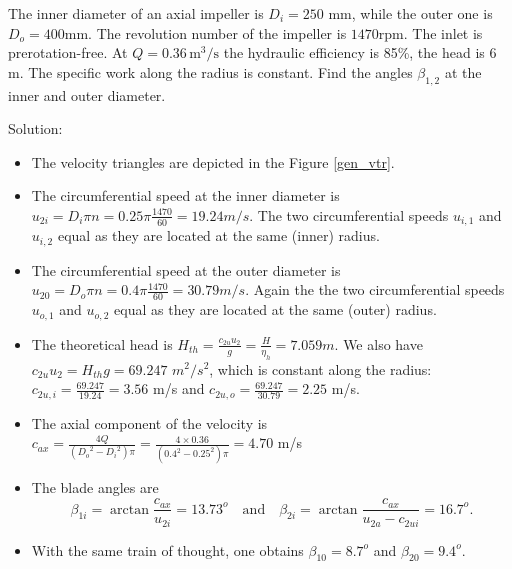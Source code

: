 \vspace{1cm}
\begin{tcolorbox}

The inner diameter of an axial impeller is $D_i=250$ mm, while the outer one is $D_o=400$mm. The revolution number of the impeller is $1470$rpm. The inlet is prerotation-free. At $Q=0.36\,\mathrm{ m^3/s}$ the hydraulic efficiency is 85\%, the head is 6 m. The specific work along the radius is constant. Find the angles $\beta_{1,2}$  at the inner and outer diameter. 


\vspace{0.2cm}

Solution:

\begin{itemize}
%
\item The velocity triangles are depicted in the Figure \ref{gen_vtr}.
%
\item The circumferential speed at the inner diameter is $u_{2i}=D_i\pi n=0.25\pi \frac{1470}{60}= 19.24 m/s$. The two circumferential speeds $u_{i,1}$ and $u_{i,2}$ equal as they are located at the same (inner) radius.
%
\item The circumferential speed at the outer diameter is $u_{20}=D_o\pi n=0.4\pi\frac{1470}{60}= 30.79 m/s$. Again the the two circumferential speeds $u_{o,1}$ and $u_{o,2}$ equal as they are located at the same (outer) radius.
%
\item The theoretical head is $H_{th}=\frac{c_{2u}u_2}{g}=\frac{H}{\eta_h}=7.059m$. We also have  $c_{2u}u_2=H_{th}g=69.247$ $m^2/s^2$, which is constant along the radius: $c_{2u,i}=\frac{69.247}{19.24}=3.56$ m/s and $c_{2u,o}=\frac{69.247}{30.79}=2.25$ m/s.
%
\item The axial component of the velocity is $c_{ax}=\frac{4Q}{\left({D_o}^2-{D_i}^2\right)\pi}=\frac{4 \times 0.36}{\left({0.4}^2-{0.25}^2\right)\pi}=4.70$ m/s
%
\item The blade angles are
\begin{equation*}
\beta_{1i}=\arctan\frac{c_{ax}}{u_{2i}}=
13.73^o \quad \text{and}\quad \beta_{2i}=\arctan\frac{c_{ax}}{u_{2a}-c_{2ui}}
=16.7^o.
\end{equation*}

\item With the same train of thought, one obtains $\beta_{10}=8.7^o$ and $\beta_{20}=9.4^o$.
\end{itemize}
\end{tcolorbox}
\vspace{1cm}

